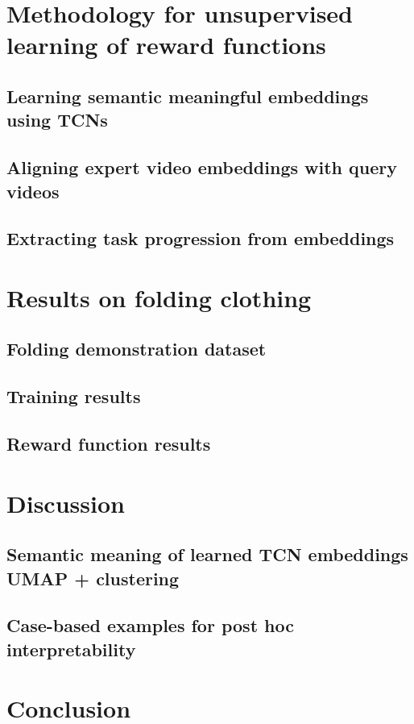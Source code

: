 \documentclass[\home/main.tex]{subfiles}
\begin{document}

\section{Methodology for unsupervised learning of reward functions}\label{sec:rewards_methodology}

\subsection{Learning semantic meaningful embeddings using TCNs}\label{subsec:rewards_tcn}

\subsection{Aligning expert video embeddings with query videos} \label{subsec:rewards_dtw}

\subsection{Extracting task progression from embeddings} \label{subsec:rewards_extract}


\section{Results on folding clothing}\label{sec:rewards_results}

\subsection{Folding demonstration dataset}

\subsection{Training results}

\subsection{Reward function results}


\section{Discussion}\label{sec:rewards_discuss}

\subsection{Semantic meaning of learned TCN embeddings {\tiny UMAP + clustering}}

\subsection{Case-based examples for post hoc interpretability}


\section{Conclusion} \label{sec:rewards_conc}
\end{document}
